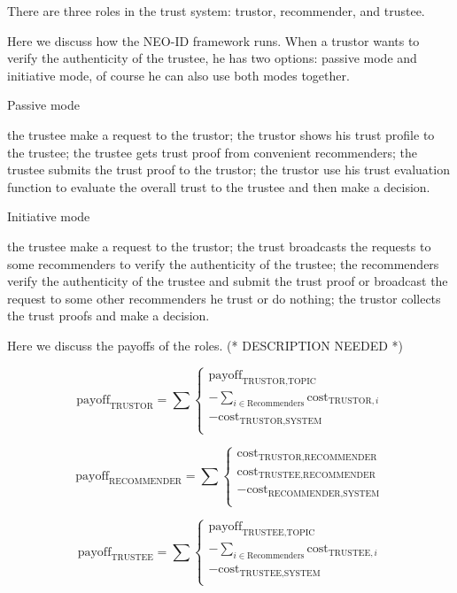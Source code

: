 \documentclass{article}
\begin{document}
There are three roles in the trust system: trustor, recommender, and trustee.

Here we discuss how the NEO-ID framework runs. When a trustor wants to verify the authenticity of the trustee, he has two options: passive mode and
initiative mode, of course he can also use both modes together.

Passive mode

the trustee make a request to the trustor; the trustor shows his trust profile to the trustee; the trustee gets trust proof from convenient recommenders;
the trustee submits the trust proof to the trustor; the trustor use his trust evaluation function to evaluate the overall trust to the trustee and
then make a decision.

Initiative mode

the trustee make a request to the trustor; the trust broadcasts the requests to some recommenders to verify the authenticity of the trustee; the
recommenders verify the authenticity of the trustee and submit the trust proof or broadcast the request to some other recommenders he trust or do
nothing; the trustor collects the trust proofs and make a decision.

Here we discuss the payoffs of the roles. (* DESCRIPTION NEEDED *)

\begin{equation}
\text{payoff}_{\text{TRUSTOR}}=\sum \left\{
\begin{array}{c}
 \text{payoff}_{\text{TRUSTOR},\text{TOPIC}} \\
 -\sum _{i\in \text{Recommenders}} \text{cost}_{\text{TRUSTOR},i} \\
 -\text{cost}_{\text{TRUSTOR},\text{SYSTEM}} \\
\end{array}
\right.
\end{equation}

\begin{equation}
\text{payoff}_{\text{RECOMMENDER}}=\sum \left\{
\begin{array}{c}
 \text{cost}_{\text{TRUSTOR},\text{RECOMMENDER}} \\
 \text{cost}_{\text{TRUSTEE},\text{RECOMMENDER}} \\
 -\text{cost}_{\text{RECOMMENDER},\text{SYSTEM}} \\
\end{array}
\right.
\end{equation}

\begin{equation}
\text{payoff}_{\text{TRUSTEE}}=\sum \left\{
\begin{array}{c}
 \text{payoff}_{\text{TRUSTEE},\text{TOPIC}} \\
 -\sum _{i\in \text{Recommenders}} \text{cost}_{\text{TRUSTEE},i} \\
 -\text{cost}_{\text{TRUSTEE},\text{SYSTEM}} \\
\end{array}
\right.
\end{equation}
\end{document}
